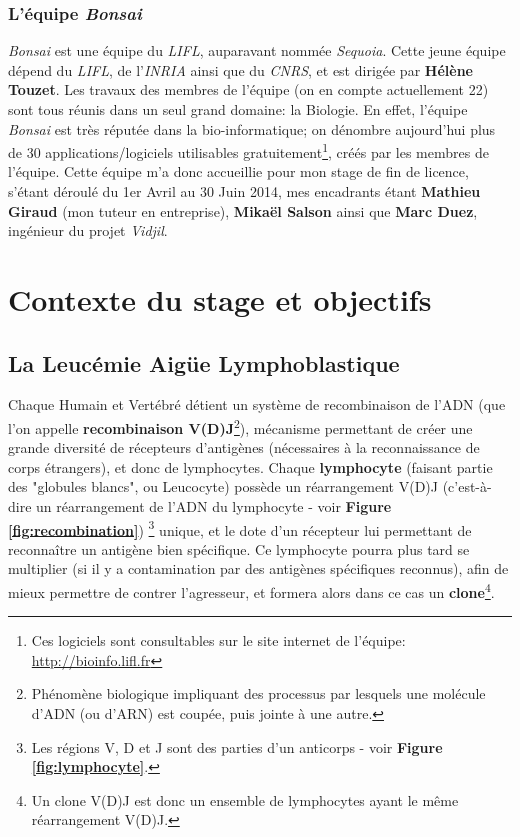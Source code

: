 \documentclass[pdftex,12pt,a4paper]{report}
\begin{document}
\begin{spacing}{1.2}
\subsection{L'équipe \textit{Bonsai}}
\textit{Bonsai} est une équipe du \textit{LIFL}, auparavant nommée \textit{Sequoia}.
Cette jeune équipe dépend du \textit{LIFL}, de l'\textit{INRIA} ainsi que du \textit{CNRS}, et est dirigée par \textbf{Hélène Touzet}.
\newline
Les travaux des membres de l'équipe (on en compte actuellement 22) sont tous réunis dans un seul grand domaine: la Biologie.
En effet, l'équipe \textit{Bonsai} est très réputée dans la bio-informatique; on dénombre aujourd'hui plus de 30 applications/logiciels utilisables gratuitement\footnote{Ces logiciels sont consultables sur le site internet de l'équipe: \url{http://bioinfo.lifl.fr}}, créés par les membres de l'équipe.
\newline
Cette équipe m'a donc accueillie pour mon stage de fin de licence, s'étant déroulé du 1er Avril au 30 Juin 2014, mes encadrants étant \textbf{Mathieu Giraud} (mon tuteur en entreprise), \textbf{Mikaël Salson} ainsi que \textbf{Marc Duez}, ingénieur du projet \textit{Vidjil}.


\chapter{Contexte du stage et objectifs}

\section{La Leucémie Aigüe Lymphoblastique}

Chaque Humain et Vertébré détient un système de recombinaison de l'ADN (que l'on appelle \textbf{recombinaison V(D)J}\footnote{Phénomène biologique impliquant des processus par lesquels une molécule d'ADN (ou d'ARN) est coupée, puis jointe à une autre.}), mécanisme permettant de créer une grande diversité de récepteurs d'antigènes (nécessaires à la reconnaissance de corps étrangers), et donc de lymphocytes.
Chaque \textbf{lymphocyte} (faisant partie des "globules blancs", ou Leucocyte) possède un réarrangement V(D)J (c'est-à-dire un réarrangement de l'ADN du lymphocyte - voir \textbf{Figure \ref{fig:recombination}}) \footnote{Les régions V, D et J sont des parties d'un anticorps - voir \textbf{Figure \ref{fig:lymphocyte}}.} unique, et le dote d'un récepteur lui permettant de reconnaître un antigène bien spécifique. Ce lymphocyte pourra plus tard se multiplier (si il y a contamination par des antigènes spécifiques reconnus), afin de mieux permettre de contrer l'agresseur, et formera alors dans ce cas un \textbf{clone}\footnote{Un clone V(D)J est donc un ensemble de lymphocytes ayant le même réarrangement V(D)J.}.


\end{spacing}
\end{document}
